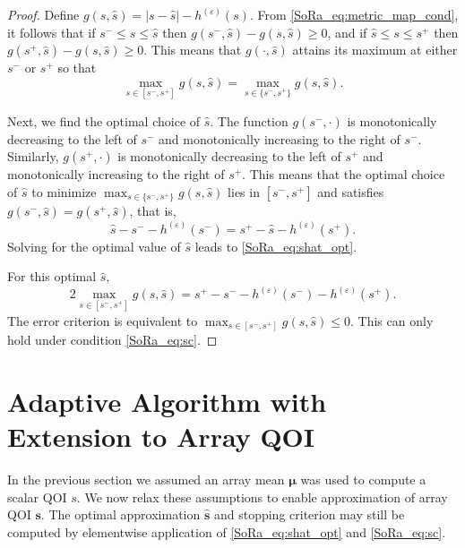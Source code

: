 \documentclass[graybox]{svmult}
\begin{document}
\begin{proof}
    Define $g(s,\hat{s})=\lvert s - \hat{s} \rvert -h^{(\varepsilon)}(s)$. From \eqref{SoRa_eq:metric_map_cond}, it follows that if  $s^- \leq s \leq \hat{s}$ then $g(s^-,\hat{s})-g(s,\hat{s}) \geq 0$, and if $\hat{s} \leq s \leq s^+$ then $g(s^+,\hat{s})-g(s,\hat{s})  \geq 0$. This means that $g(\cdot,\hat{s})$ attains its maximum at either $s^-$ or $s^+$ so that
    \begin{equation*}
        \max_{s \in [s^-,s^+]} g(s,\hat{s}) = \max_{s \in \{s^-,s^+\}} g(s,\hat{s}).
    \end{equation*}
    
    Next, we find the optimal choice of $\hat{s}$.  The function $g(s^-,\cdot)$ is monotonically decreasing to the left of  $s^-$ and monotonically increasing to the right of $s^-$. Similarly, $g(s^+,\cdot)$ is monotonically decreasing to the left of $s^+$ and monotonically increasing to the right of $s^+$. This means that the optimal choice of $\hat{s}$ to minimize $\max_{s \in \{s^-,s^+\}} g(s,\hat{s})$ lies in $[s^-,s^+]$ and satisfies $g(s^-,\hat{s}) = g(s^+,\hat{s})$, that is, 
    $$\hat{s} - s^- - h^{(\varepsilon)}(s^-) = s^+ - \hat{s} - h^{(\varepsilon)}(s^+).$$
    Solving for the optimal value of $\hat{s}$ leads to \eqref{SoRa_eq:shat_opt}.
    
    For this optimal $\hat{s}$, 
    $$2 \max_{s \in [s^-,s^+]} g(s,\hat{s}) =  s^+  -  s^-  - h^{(\varepsilon)}(s^-) - h^{(\varepsilon)}(s^+).$$
    The error criterion is equivalent to $\max_{s \in [s^-,s^+]} g(s,\hat{s}) \le 0 $.  This can only hold under condition  \eqref{SoRa_eq:sc}. 
\end{proof}

\section{Adaptive Algorithm with Extension to Array QOI} \label{SoRa_sec: Vectorized Implementation}

In the previous section we assumed an array mean $\boldsymbol{\mu}$ was used to compute a scalar QOI $s$. We now relax these assumptions to enable approximation of array QOI $\boldsymbol{s}$. The optimal approximation $\hat{\boldsymbol{s}}$ and stopping criterion may still be computed by elementwise application of \eqref{SoRa_eq:shat_opt} and \eqref{SoRa_eq:sc}. 
\end{document}

